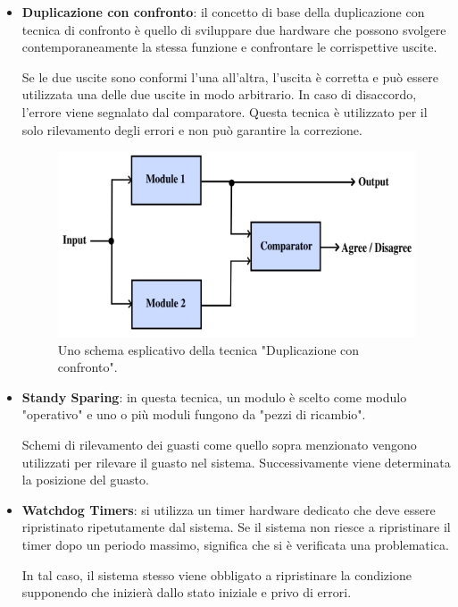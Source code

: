 \documentclass[LaM,binding=0.6cm,oneside]{../sapthesis}
\begin{document}
\begin{itemize}
    \item \textbf{Duplicazione con confronto}: il concetto di base della duplicazione con tecnica di confronto è quello di sviluppare due hardware che possono svolgere contemporaneamente la stessa funzione e confrontare le corrispettive uscite.
    
    Se le due uscite sono conformi l'una all'altra, l'uscita è corretta e può essere utilizzata una delle due uscite in modo arbitrario. In caso di disaccordo, l'errore viene segnalato dal comparatore. Questa tecnica è utilizzato per il solo rilevamento degli errori e non può garantire la correzione.
    \begin{figure}[htbp]
    \centerline{\includegraphics[scale=.67]{examples/ActiveComparator.PNG}}
    \caption{Uno schema esplicativo della tecnica "Duplicazione con confronto".}
    \label{fig}
    \end{figure}
\newline
    
    \item \textbf{Standy Sparing}: in questa tecnica, un modulo è scelto come modulo "operativo" e uno o più moduli fungono da "pezzi di ricambio".
    
    Schemi di rilevamento dei guasti come quello sopra menzionato vengono utilizzati per rilevare il guasto nel sistema. Successivamente viene determinata la posizione del guasto. 
    
    \item \textbf{Watchdog Timers}: si utilizza un timer hardware dedicato che deve essere ripristinato ripetutamente dal sistema. Se il sistema non riesce a ripristinare il timer dopo un periodo massimo, significa che si è verificata una problematica.
    
    In tal caso, il sistema stesso viene obbligato a ripristinare la condizione supponendo che
    inizierà dallo stato iniziale e privo di errori.
    
\end{itemize}
\end{document}
